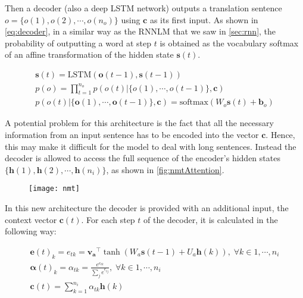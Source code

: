 Then a decoder (also a deep LSTM network) outputs a translation sentence $o=\{o(1), o(2), \cdots, o(n_o)\}$ using $\mathbf{c}$ as its first input. As shown in \autoref{eq:decoder}, in a similar way as the RNNLM that we saw in \autoref{sec:rnn}, the probability of outputting a word at step $t$ is obtained as the vocabulary softmax of an affine transformation of the hidden state $\mathbf{s}(t)$.

\begin{equation} \label{eq:decoder}
	\begin{gathered}
		\mathbf{s}(t) = \text{LSTM}(\mathbf{o}(t-1), \mathbf{s}(t-1)) \\
		p(o) = \prod_{t=1}^{n_o} p(o(t)|\{o(1), \cdots, o(t-1)\}, \mathbf{c}) \\
		p(o(t)|\{\mathbf{o}(1), \cdots, \mathbf{o}(t-1)\}, \mathbf{c}) = \text{softmax}(W_o \mathbf{s}(t) +\textbf{b}_o)
	\end{gathered}
\end{equation}

A potential problem for this architecture is the fact that all the necessary information from an input sentence has to be encoded into the vector $\mathbf{c}$. Hence, this may make it difficult for the model to deal with long sentences. Instead the decoder is allowed to access the full sequence of the encoder's hidden states $\{\mathbf{h}(1), \mathbf{h}(2), \cdots, \mathbf{h}(n_i)\}$, as shown in \autoref{fig:nmtAttention}.

\begin{figure}[H]
	\centering
	\texttt{[image: nmt]}
	\label{fig:nmtAttention}
\end{figure}

In this new architecture the decoder is provided with an additional input, the context vector $\mathbf{c}(t)$. For each step $t$ of the decoder, it is calculated in the following way:

\begin{equation} \label{eq:nmtAttention}
	\begin{gathered}
		\mathbf{e}(t)_k = e_{tk} = \mathbf{v_a}^{\top} \tanh(W_a \mathbf{s}(t-1)+U_a\mathbf{h}(k)), \; \forall k \in 1, \cdots , n_i  \\
		\boldsymbol{\alpha}(t)_k = \alpha_{tk} = \frac{e^{e_{tk}}}{\sum_{j}e^{e_{tj}}}, \; \forall k \in 1, \cdots , n_i  \\
		\mathbf{c}(t) = \sum_{k=1}^{n_i} \alpha_{tk} \mathbf{h}(k)
	\end{gathered}
\end{equation}

